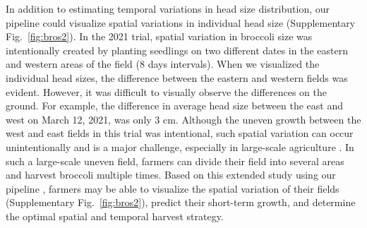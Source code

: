 
In addition to estimating temporal variations in head size distribution, our pipeline could visualize spatial variations in individual head size (Supplementary Fig.~\ref{fig:bros2}). In the 2021 trial, spatial variation in broccoli size was intentionally created by planting seedlings on two different dates in the eastern and western areas of the field (8 days intervals). When we visualized the individual head sizes, the difference between the eastern and western fields was evident. However, it was difficult to visually observe the differences on the ground. For example, the difference in average head size between the east and west on March 12, 2021, was only 3 cm. Although the uneven growth between the west and east fields in this trial was intentional, such spatial variation can occur unintentionally and is a major challenge, especially in large-scale agriculture \citep{quine_investigation_2002}. In such a large-scale uneven field, farmers can divide their field into several areas and harvest broccoli multiple times. Based on this extended study using our pipeline \citep{nishida_estimation_2023}, farmers may be able to visualize the spatial variation of their fields (Supplementary Fig.~\ref{fig:bros2}), predict their short-term growth, and determine the optimal spatial and temporal harvest strategy.

